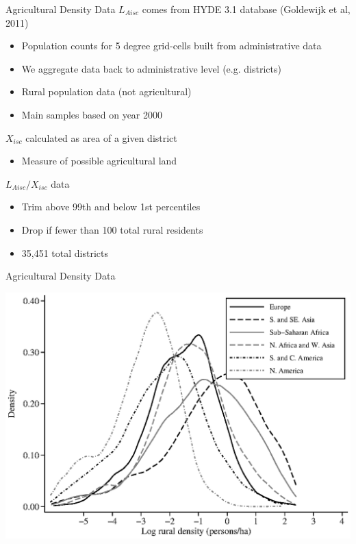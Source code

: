 \documentclass[10pt, xcolor=dvipsnames]{beamer}
\begin{document}
\begin{frame}{Agricultural Density Data}
$L_{Aisc}$ comes from HYDE 3.1 database (Goldewijk et al, 2011)
\begin{itemize}
  \item Population counts for 5 degree grid-cells built from administrative data
  \item We aggregate data back to administrative level (e.g. districts)
  \item Rural population data (not agricultural)
  \item Main samples based on year 2000
\end{itemize}
$X_{isc}$ calculated as area of a given district
\begin{itemize}
  \item Measure of possible agricultural land
\end{itemize}
$L_{Aisc}/X_{isc}$ data 
\begin{itemize}
  \item Trim above 99th and below 1st percentiles
  \item Drop if fewer than 100 total rural residents
  \item 35,451 total districts
\end{itemize}
\end{frame}

\begin{frame}{Agricultural Density Data}
\begin{center}
\includegraphics[width=.8\textwidth]{fig_dens_rurd.eps}
\end{center}
\end{frame}
\end{document}
